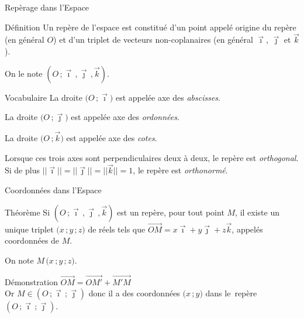 \documentclass{coursbook}
\begin{document}
    \vfill
    \begin{Gpartie}{Repèrage dans l'Espace} 
        \begin{Spartie}{Définition} 
            Un repère de l'espace est constitué d'un point appelé origine du repère (en général $O$) et d'un triplet de vecteurs non-coplanaires (en général $\vec{\imath}$, $\vec{\jmath}$ et $\vec{k}$).

            On le note $\left(O\,;\vec{\imath}\,,\vec{\jmath}\,,\vec{k}\right)$.
        \end{Spartie}
        \begin{Spartie}{Vocabulaire} 
            La droite $\big(O\,;\vec{\imath}\big)$ est appelée axe des \emph{abscisses}.

            La droite $\big(O\,;\vec{\jmath}\big)$ est appelée axe des \emph{ordonnées}.

            La droite $\big(O\,;\vec{k}\big)$ est appelée axe des \emph{cotes}.

            Lorsque ces trois axes sont perpendiculaires deux à deux, le repère est \emph{orthogonal}. \\ Si de plus $\lvert\lvert\vec{\imath}\rvert\rvert=\lvert\lvert\vec{\jmath}\rvert\rvert=\lvert\lvert\vec{k}\rvert\rvert=1$, le repère est \emph{orthonormé}.
        \end{Spartie}
        \pagebreak
        \begin{Spartie}{Coordonnées dans l'Espace} 
            \begin{SSpartie}{Théorème} 
                Si $\left(O\,;\vec{\imath}\,,\vec{\jmath}\,,\vec{k}\right)$ est un repère, pour tout point $M$, il existe un unique triplet $\big(x\,; y\,; z\big)$ de réels tels que $\overrightarrow{OM}=x\vec{\imath}+y\vec{\jmath}+z\vec{k}$, appelés coordonnées de $M$.

                On note $M\,\big(x\,; y\,; z\big)$.
                \begin{SSSpartie}{Démonstration} 
                    $\overrightarrow{OM}=\overrightarrow{OM'}+\overrightarrow{M'M}$ \\
                    Or $M\in\left(O\,;\vec{\imath}\,;\vec{\jmath}\right)$ donc il a des coordonnées $\big(x\,; y\big)$ dans le~repère~$\left(O\,;\vec{\imath}\,;\vec{\jmath}\right)$.


\end{SSSpartie}
\end{SSpartie}
\end{Spartie}
\end{Gpartie}
\end{document}
